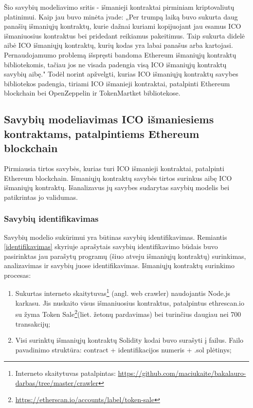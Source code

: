 \documentclass{VUMIFPSbakalaurinis}
\begin{document}
Šio savybių modeliavimo sritis - išmanieji kontraktai pirminiam kriptovaliutų platinimui. Kaip jau buvo minėta įvade: „Per trumpą laiką buvo sukurta daug panašių išmaniųjų kontraktų, kurie dažnai kuriami kopijuojant jau esamus ICO išmaniuosius kontraktus bei pridedant reikiamus pakeitimus. Taip sukurta didelė aibė ICO išmaniųjų kontraktų, kurių kodas yra labai panašus arba kartojasi. Pernaudojamumo problemą išspręsti bandoma Ethereum išmaniųjų kontraktų bibliotekomis, tačiau jos ne visada padengia visą ICO išmaniųjų kontraktų savybių aibę." Todėl norint apžvelgti, kurias ICO išmaniųjų kontraktų savybes bibliotekos padengia, tiriami ICO išmanieji kontraktai, patalpinti Ethereum blockchain bei OpenZeppelin ir TokenMartket bibliotekose.

\subsection{Savybių modeliavimas ICO išmaniesiems kontraktams, patalpintiems Ethereum blockchain}

Pirmiausia tirtos savybės, kurias turi ICO išmanieji kontraktai, patalpinti Ethereum blockchain. Išmaniųjų kontraktų savybės tirtos surinkus aibę ICO išmaniųjų kontraktų. Išanalizavus jų savybes sudarytas savybių modelis bei patikrintas jo validumas.


\subsubsection{Savybių identifikavimas} \label{identifikavimas_eth}


Savybių modelio sukūrimui yra būtinas savybių identifikavimas. Remiantis \ref{identifikavimas} skyriuje aprašytais savybių identifikavimo būdais buvo pasirinktas jau parašytų programų (šiuo atveju išmaniųjų kontraktų) surinkimas, analizavimas ir savybių juose identifikavimas. Išmaniųjų kontraktų surinkimo procesas:
\begin{enumerate}[topsep=0pt,itemsep=-1ex,partopsep=1ex,parsep=1ex]
\item Sukurtas interneto skaitytuvas\footnote{Interneto skaitytuvas patalpintas: \url{https://github.com/maciukaite/bakalauro-darbas/tree/master/crawler}} (angl. web crawler) naudojantis Node.js karkasu. Jis nuskaito visus išmaniuosius kontraktus, patalpintus ethrescan.io su žyma Token Sale\footnote{\url{https://etherscan.io/accounts/label/token-sale}}(liet. žetonų pardavimas) bei turinčius daugiau nei 700 transakcijų;
\item Visi surinktų išmaniųjų kontraktų Solidity kodai buvo surašyti į failus. Failo pavadinimo struktūra: contract + identifikacijos numeris + .sol plėtinys;
\end{enumerate}
\end{document}
